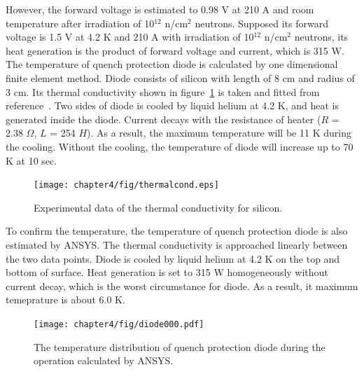However, the forward voltage is estimated to 0.98 V at 210 A and room temperature after irradiation of 10$^{12}$ n/cm$^2$ neutrons.
Supposed its forward voltage is 1.5 V at 4.2 K and 210 A with irradiation of 10$^{12}$ n/cm$^2$ neutrons, its heat generation is the product of forward voltage and current, which is 315 W.
The temperature of quench protection diode is calculated by one dimensional finite element method.
Diode consists of silicon with length of 8 cm and radius of 3 cm.
Its thermal conductivity shown in figure~\ref{sicond} is taken and fitted from reference~\cite{glass}\cite{holl}.
Two sides of diode is cooled by liquid helium at 4.2 K, and heat is generated inside the diode.
Current decays with the resistance of heater ($R$ = 2.38 $\Omega$, $L$ = 254 $H$).
As a result, the maximum temperature will be 11 K during the cooling.
Without the cooling, the temperature of diode will increase up to 70 K at 10 sec.
\begin{figure}[H]
  \centering
  \texttt{[image: chapter4/fig/thermalcond.eps]}
  \caption{Experimental data of the thermal conductivity for silicon.}
  \label{sicond}
\end{figure}
To confirm the temperature, the temperature of quench protection diode is also estimated by ANSYS.
The thermal conductivity is approached linearly between the two data points.
Diode is cooled by liquid helium at 4.2 K on the top and bottom of surface.
Heat generation is set to 315 W homogeneously without current decay, which is the worst circumstance for diode.
As a result, it maximum temeprature is about 6.0 K.
\begin{figure}[H]
 \centering
 \texttt{[image: chapter4/fig/diode000.pdf]}
 \caption{The temperature distribution of quench protection diode during the operation calculated by ANSYS.}
 \label{ansys}
\end{figure}



